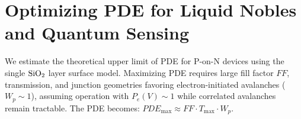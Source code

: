 

\section{Optimizing PDE for Liquid Nobles and Quantum Sensing}
\label{sec:maximize}

We estimate the theoretical upper limit of PDE for P-on-N devices using the single $\sio$ layer surface model. Maximizing PDE requires large fill factor $FF$, transmission, and junction geometries favoring electron-initiated avalanches ($W_p \sim 1$), assuming operation with $P_e(V) \sim 1$ while correlated avalanches remain tractable. The PDE becomes: $PDE_{\text{max}} \approx FF \cdot T_{\text{max}} \cdot W_p$.

